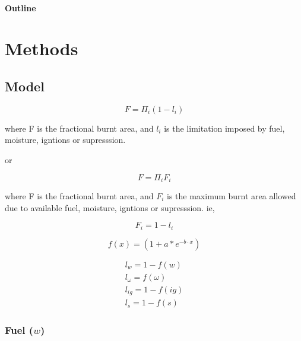 \documentclass[12pt]{article}
\begin{document}
\paragraph{Outline}

\section{Methods}

\subsection{Model}

\begin{equation}
    F=\Pi_{i} (1 - l_i)
\end{equation}

where F is the fractional burnt area, and $l_i$ is the limitation imposed by fuel, moisture, igntions or supresssion.
\newline

or

\begin{equation}
    F=\Pi_{i} F_i
\end{equation}

where F is the fractional burnt area, and $F_i$ is the maximum burnt area allowed due to available fuel, moisture, igntions or supresssion. ie,

\begin{equation}
    F_i = 1 - l_i
\end{equation}

\begin{equation}
    f(x) = (1 + a * e^{-b \cdot x})
\end{equation}

\begin{equation}
\begin{split}
    l_{w} = 1 - f(w) \\
    l_{\omega} = f(\omega) \\
    l_{ig} = 1 - f(ig) \\
    l_{s} = 1- f(s)
\end{split}
\end{equation}


\subsubsection{Fuel ($w$)}
\end{document}

